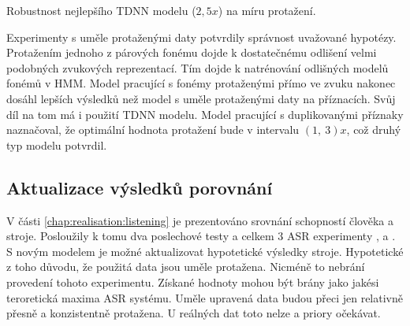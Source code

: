 \begin{table}[htpb]
  \centering
  \def\arraystretch{1.5}
  \caption{Robustnost nejlepšího TDNN modelu ($2,5x$) na míru protažení.}
  \label{tab:realisation:augmentation:influence:tdnn:robust}
\end{table}

Experimenty s uměle protaženými daty potvrdily správnost uvažované hypotézy. Protažením jednoho z párových fonému dojde k dostatečnému odlišení velmi podobných zvukových reprezentací. Tím dojde k natrénování odlišných modelů fonémů v HMM. Model pracující s fonémy protaženými přímo ve zvuku nakonec dosáhl lepších výsledků než model s uměle protaženými daty na příznacích. Svůj díl na tom má i použití TDNN modelu. Model pracující s duplikovanými příznaky naznačoval, že optimální hodnota protažení bude v intervalu $\left(1,\ 3\right)x$, což druhý typ modelu potvrdil.

\subsection{Aktualizace výsledků porovnání}
\label{chap:realisation:augmentation:comparison}

V části \ref{chap:realisation:listening} je prezentováno srovnání schopností člověka a stroje. Posloužily k tomu dva poslechové testy a celkem $3$ ASR experimenty ,  a . S novým modelem je možné aktualizovat hypotetické výsledky stroje. Hypotetické z toho důvodu, že použitá data jsou uměle protažena. Nicméně to nebrání provedení tohoto experimentu. Získané hodnoty mohou být brány jako jakési teroretická maxima ASR systému. Uměle upravená data budou přeci jen relativně přesně a konzistentně protažena. U reálných dat toto nelze a priory očekávat.

